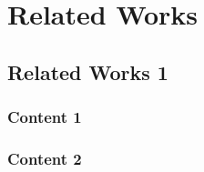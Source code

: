 \section{Related Works}
\subsection{Related Works 1}
\subsubsection{Content 1}
\subsubsection{Content 2}
